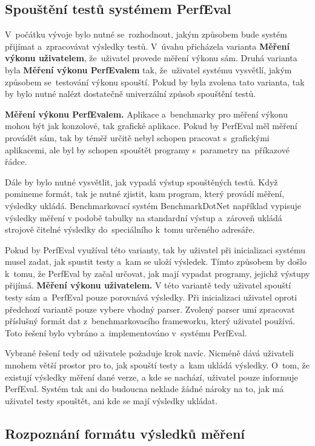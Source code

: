 \subsection{Spouštění testů systémem PerfEval}
V~počátku vývoje bylo nutné se~rozhodnout, jakým způsobem bude systém přijímat a~zpracovávat výsledky testů.
V~úvahu přicházela varianta \textbf{Měření výkonu uživatelem}, že~uživatel provede měření výkonu sám. Druhá varianta byla \textbf{Měření výkonu PerfEvalem} tak,
že~uživatel systému vysvětlí, jakým způsobem se~testování výkonu spouští. Pokud by byla zvolena tato varianta,
tak by bylo nutné nalézt dostatečně univerzální způsob spouštění testů.

\medskip

\noindent\textbf{Měření výkonu PerfEvalem.} Aplikace a~benchmarky pro měření výkonu mohou být jak konzolové, tak grafické aplikace. Pokud by PerfEval měl
měření provádět sám, tak by téměř určitě nebyl schopen pracovat s~grafickými aplikacemi, ale byl by schopen
spouštět programy s~parametry na~příkazové řádce.

Dále by bylo nutné vysvětlit, jak vypadá výstup spouštěných testů. Když pomineme formát, tak je nutné zjistit,
kam program, který provádí měření, výsledky ukládá. Benchmarkovací systém BenchmarkDotNet například vypisuje
výsledky měření v podobě tabulky na standardní výstup a~zároveň ukládá strojově čitelné výsledky do~speciálního
k~tomu určeného adresáře.

Pokud by PerfEval využíval této varianty, tak by uživatel při inicializaci systému musel zadat, jak spustit testy
a~kam se uloží výsledek. Tímto způsobem by došlo k~tomu, že PerfEval by začal určovat, jak mají vypadat programy,
jejichž výstupy přijímá.
\medskip
\noindent\textbf{Měření výkonu uživatelem.} V této variantě tedy uživatel spouští testy sám a~PerfEval pouze porovnává výsledky.
Při inicializaci uživatel oproti předchozí variantě pouze vybere vhodný parser. Zvolený parser umí zpracovat příslušný formát dat z~benchmarkovacího frameworku,
který uživatel používá. Toto řešení bylo vybráno a~implementováno v~systému PerfEval.

Vybrané řešení tedy od uživatele požaduje krok navíc. Nicméně dává uživateli mnohem větší prostor pro to, jak
spouští testy a~kam ukládá výsledky. O~tom, že existují výsledky měření dané verze, a kde se nachází, uživatel
pouze informuje PerfEval. Systém tak ani do budoucna neklade žádné nároky na to, jak má uživatel testy spouštět,
ani kde se mají výsledky ukládat.

\subsection{Rozpoznání formátu výsledků měření}

